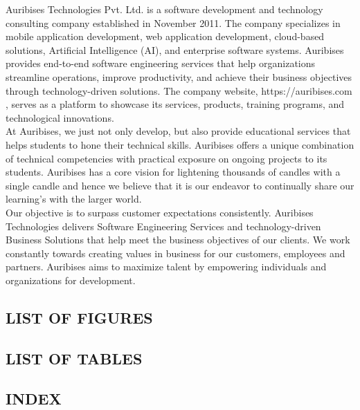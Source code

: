 \documentclass[12pt, oneside]{article}
\begin{document}
Auribises Technologies Pvt. Ltd. is a software development and technology consulting company established in November 2011. The company specializes in mobile application development, web application development, cloud-based solutions, Artificial Intelligence (AI), and enterprise software systems. Auribises provides end-to-end software engineering services that help organizations streamline operations, improve productivity, and achieve their business objectives through technology-driven solutions. The company website, https://auribises.com \cite{auribises}, serves as a platform to showcase its services, products, training programs, and technological innovations.
\\[0.25cm]
At Auribises, we just not only develop, but also provide educational services that helps students to hone their technical skills. Auribises offers a unique combination of technical competencies with practical exposure on ongoing projects to its students. Auribises has a core vision for lightening thousands of candles with a single candle and hence we believe that it is our endeavor to continually share our learning’s with the larger world.\\[0.25cm]
Our objective is to surpass customer expectations consistently. Auribises Technologies delivers Software Engineering Services and technology-driven Business Solutions that help meet the business objectives of our clients. We work constantly towards creating values in business for our customers, employees and partners. Auribises aims to maximize talent by empowering individuals and organizations for development.

\newpage
\begin{center}
    \section*{LIST OF FIGURES}
\end{center}
\listoffigures

\newpage
\begin{center}
    \section*{LIST OF TABLES}
\end{center}
\listoftables


\newpage
\begin{center}
    \section*{INDEX}
\end{center}
\tableofcontents
\end{document}
